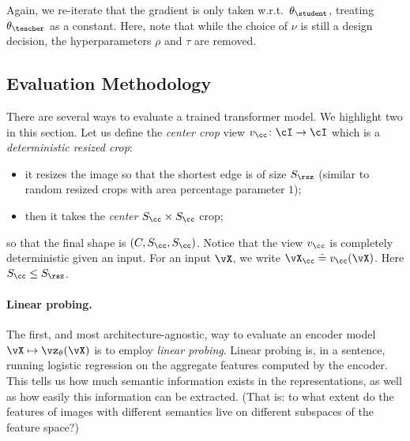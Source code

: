 \documentclass[../../book-main.tex]{subfiles}
\begin{document}
Again, we re-iterate that the gradient is only taken w.r.t.~\(\theta_{\student}\), treating \(\theta_{\teacher}\) as a constant. Here, note that while the choice of \(\nu\) is still a design decision, the hyperparameters \(\rho\) and \(\tau\) are removed.


\subsection{Evaluation Methodology}\label{sub:contrastive_learning_evals}
There are several ways to evaluate a trained transformer model. We highlight two in this section. Let us define the \textit{center crop} view \(v_{\cc} \colon \cI \to \cI\) which is a \textit{deterministic resized crop}:
\begin{itemize}
    \item it resizes the image so that the shortest edge is of size \(S_{\rsz}\) (similar to random resized crops with area percentage parameter \(1\));
    \item then it takes the \textit{center} \(S_{\cc} \times S_{\cc}\) crop;
\end{itemize}
so that the final shape is \((C, S_{\cc}, S_{\cc})\). Notice that the view \(v_{\cc}\) is completely deterministic given an input. For an input \(\vX\), we write \(\vX_{\cc} \doteq v_{\cc}(\vX)\). Here \(S_{\cc} \leq S_{\rsz}\).


\paragraph{Linear probing.}

The first, and most architecture-agnostic, way to evaluate an encoder model \(\vX \mapsto \vz_{\theta}(\vX)\) is to employ \textit{linear probing}. Linear probing is, in a sentence, running logistic regression on the aggregate features computed by the encoder. This tells us how much semantic information exists in the representations, as well as how easily this information can be extracted. (That is: to what extent do the features of images with different semantics live on different subspaces of the feature space?)
\end{document}
